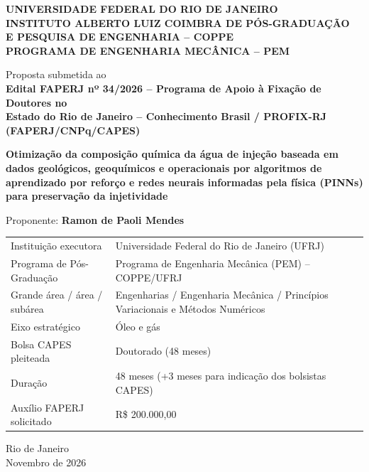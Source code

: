 \documentclass[10pt,a4paper]{article}
\begin{document}
\begin{titlepage}
\thispagestyle{empty}
\begin{center}
{\large\bfseries UNIVERSIDADE FEDERAL DO RIO DE JANEIRO\\[0.3em]
INSTITUTO ALBERTO LUIZ COIMBRA DE PÓS-GRADUAÇÃO\\ E PESQUISA DE ENGENHARIA -- COPPE\\[0.3em]
PROGRAMA DE ENGENHARIA MECÂNICA -- PEM}

\vspace{0.9cm}
{\normalsize Proposta submetida ao\\[0.3em]
\bfseries Edital FAPERJ nº 34/2026 -- Programa de Apoio à Fixação de Doutores no\\
Estado do Rio de Janeiro -- Conhecimento Brasil / PROFIX-RJ\\
(FAPERJ/CNPq/CAPES)}

\vspace{1.0cm}
{\LARGE\bfseries{}
Otimização da composição química da água de injeção baseada em dados geológicos,
geoquímicos e operacionais por algoritmos de aprendizado por reforço e redes
neurais informadas pela física (PINNs) para preservação da injetividade\par}

\vspace{1.0cm}
{\large Proponente: \textbf{Ramon de Paoli Mendes}}
\end{center}

\vfill
\noindent
{\small
\begin{tabularx}{\textwidth}{@{}lX@{}}
\toprule
Instituição executora       & Universidade Federal do Rio de Janeiro (UFRJ) \\
Programa de Pós-Graduação   & Programa de Engenharia Mecânica (PEM) -- COPPE/UFRJ \\
Grande área / área / subárea & Engenharias / Engenharia Mecânica / Princípios Variacionais e Métodos Numéricos \\
Eixo estratégico            & Óleo e gás \\
Bolsa CAPES pleiteada       & Doutorado (48 meses) \\
Duração                     & 48 meses (+3 meses para indicação dos bolsistas CAPES) \\
Auxílio FAPERJ solicitado   & R\$ 200.000,00 \\
\bottomrule
\end{tabularx}}

\vspace{0.5cm}
\begin{center}
Rio de Janeiro\\
Novembro de 2026
\end{center}
\end{titlepage}
\end{document}
